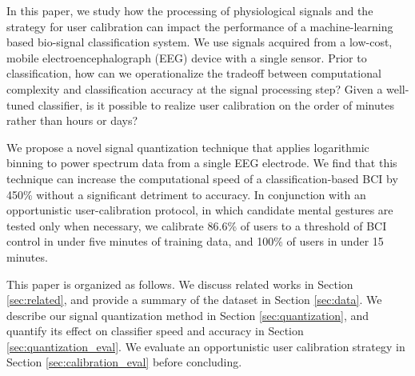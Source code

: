 
In this paper, we study how the processing of physiological signals and the strategy for user calibration can impact the performance of a machine-learning based bio-signal classification system. We use signals acquired from a low-cost, mobile electroencephalograph (EEG) device with a single sensor. Prior to classification, how can we operationalize the tradeoff between computational complexity and classification accuracy at the signal processing step? Given a well-tuned classifier, is it possible to realize user calibration on the order of minutes rather than hours or days?


We propose a novel signal quantization technique that applies logarithmic binning to power spectrum data from a single EEG electrode. We find that this technique can increase the computational speed of a classification-based BCI by 450\% without a significant detriment to accuracy. In conjunction with an opportunistic user-calibration protocol, in which candidate mental gestures are tested only when necessary, we calibrate 86.6\% of users to a threshold of BCI control in under five minutes of training data, and 100\% of users in under 15 minutes. 

This paper is organized as follows. We discuss related works in Section \ref{sec:related}, and provide a summary of the dataset in Section \ref{sec:data}. We describe our signal quantization method in Section \ref{sec:quantization}, and quantify its effect on classifier speed and accuracy in Section \ref{sec:quantization_eval}. We evaluate an opportunistic user calibration strategy in Section \ref{sec:calibration_eval} before concluding.
